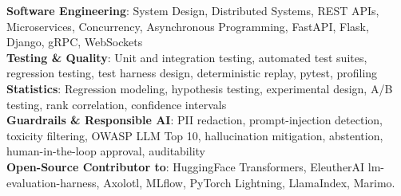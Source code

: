 \documentclass[letterpaper,10pt]{article}
\newcommand{\todo}[1]{{\color{red}\textbf{[#1]}}}
\newcommand{\sectionspace}{\vspace{-6pt}}
\newcommand{\resumeItem}[1]{\item{{#1 \vspace{-3pt}}}}
\newcommand{\titleItem}[1]{\textbf{#1}}
\newcommand{\resumeSubHeadingListStart}{\vspace{-2pt}\begin{itemize}[leftmargin=0.15in, label={}]}
\newcommand{\resumeSubHeadingListEnd}{\end{itemize}}
\newcommand{\resumeItemListStart}{\begin{itemize}}
\newcommand{\resumeItemListEnd}{\end{itemize}\vspace{-7pt}}
\begin{document}
\begin{itemize}[leftmargin=0.15in, label=]
{\titleItem{Software Engineering}{: System Design, Distributed Systems, REST APIs, Microservices, Concurrency, Asynchronous Programming, FastAPI, Flask, Django, gRPC, WebSockets}\\
\titleItem{Testing \& Quality}{: Unit and integration testing, automated test suites, regression testing, test harness design, deterministic replay, pytest, profiling} \\
\titleItem{Statistics}{: Regression modeling, hypothesis testing, experimental design, A/B testing, rank correlation, confidence intervals} \\
\titleItem{Guardrails \& Responsible AI}{: PII redaction, prompt-injection detection, toxicity filtering, OWASP LLM Top 10, hallucination mitigation, abstention, human-in-the-loop approval, auditability} \\
\titleItem{Open-Source Contributor to}{: HuggingFace Transformers, EleutherAI lm-evaluation-harness, Axolotl, MLflow, PyTorch Lightning, LlamaIndex, Marimo.}
    }
 \end{itemize}
\sectionspace

\end{document}

